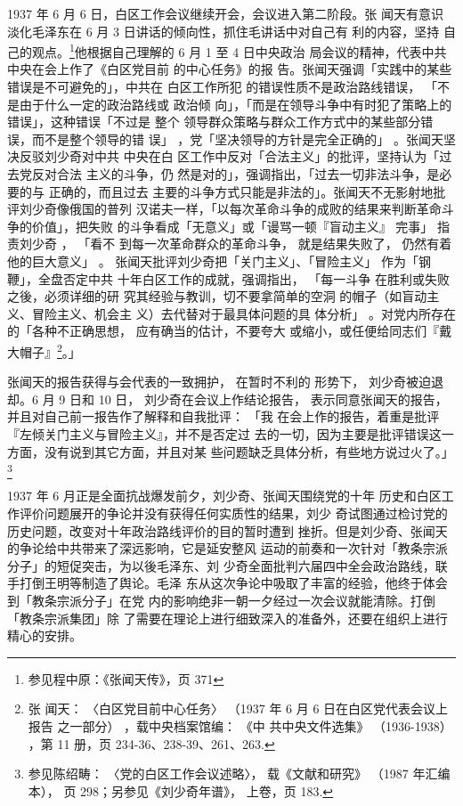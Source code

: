1937 年 6 月 6 日，白区工作会议继续开会，会议进入第二阶段。张 闻天有意识
淡化毛泽东在 6 月 3 日讲话的倾向性，抓住毛讲话中对自己有 利的内容，坚持
自己的观点。\footnote{参见程中原：《张闻天传》，页 371}他根据自己理解的
6 月 1 至 4 日中央政治 局会议的精神，代表中共中央在会上作了《白区党目前
的中心任务》的报 告。张闻天强调「实践中的某些错误是不可避免的」，中共在
白区工作所犯 的错误性质不是政治路线错误， 「不是由于什么一定的政治路线或
政治倾 向」，「而是在领导斗争中有时犯了策略上的错误」，这种错误「不过是
整个 领导群众策略与群众工作方式中的某些部分错误，而不是整个领导的错 误」
，党「坚决领导的方针是完全正确的」 。张闻天坚决反驳刘少奇对中共 中央在白
区工作中反对「合法主义」的批评，坚持认为「过去党反对合法 主义的斗争，仍
然是对的」，强调指出，「过去一切非法斗争，是必要的与 正确的，而且过去
主要的斗争方式只能是非法的」。张闻天不无影射地批评刘少奇像俄国的普列
汉诺夫一样，「以每次革命斗争的成败的结果来判断革命斗争的价值」，把失败
的斗争看成「无意义」或「谩骂一顿『盲动主义』 完事」 指责刘少奇 ， 「看不
到每一次革命群众的革命斗争， 就是结果失败了， 仍然有着他的巨大意义」 。
张闻天批评刘少奇把「关门主义」、「冒险主义」 作为「钢鞭」，全盘否定中共
十年白区工作的成就，强调指出， 「每一斗争 在胜利或失败之後，必须详细的研
究其经验与教训，切不要拿简单的空洞 的帽子（如盲动主义、冒险主义、机会主
义）去代替对于最具体问题的具 体分析」 。对党内所存在的「各种不正确思想，
应有确当的估计，不要夸大 或缩小，或任便给同志们『戴大帽子』\footnote{张
闻天： 〈白区党目前中心任务〉 （1937 年 6 月 6 日在白区党代表会议上报告
之一部分） ，载中央档案馆编： 《中 共中央文件选集》 （1936-1938） ，第
11 册，页 234-36、238-39、261、263.}。」

张闻天的报告获得与会代表的一致拥护，
在暂时不利的
形势下，
刘少奇被迫退却。6 月 9 日和 10 日，
刘少奇在会议上作结论报告，
表示同意张闻天的报告，
并且对自己前一报告作了解释和自我批评：
「我
在会上作的报告，着重是批评『左倾关门主义与冒险主义』，并不是否定过
去的一切，因为主要是批评错误这一方面，没有说到其它方面，并且对某
些问题缺乏具体分析，有些地方说过火了。」\footnote{参见陈绍畴：
〈党的白区工作会议述略〉，
载《文献和研究》
（1987 年汇编本），
页 298；另参见《刘少奇年谱》，
上卷，页 183.}

1937 年 6 月正是全面抗战爆发前夕，刘少奇、张闻天围绕党的十年
历史和白区工作评价问题展开的争论并没有获得任何实质性的结果，刘少
奇试图通过检讨党的历史问题，改变对十年政治路线评价的目的暂时遭到
挫折。但是刘少奇、张闻天的争论给中共带来了深远影响，它是延安整风
运动的前奏和一次针对「教条宗派分子」的短促突击，为以後毛泽东、刘
少奇全面批判六届四中全会政治路线，联手打倒王明等制造了舆论。毛泽
东从这次争论中吸取了丰富的经验，他终于体会到「教条宗派分子」在党
内的影响绝非一朝一夕经过一次会议就能清除。打倒「教条宗派集团」除
了需要在理论上进行细致深入的准备外，还要在组织上进行精心的安排。

